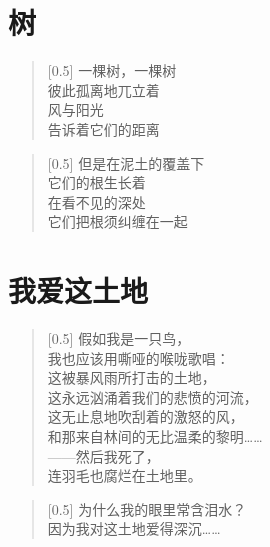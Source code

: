 \documentclass[12pt,UTF-8,openany]{ctexbook}
\begin{document}
\chapter{树}

\begin{normalsize}
    
    \begin{verse}[0.5\linewidth]
        一棵树，一棵树 \\
        彼此孤离地兀立着 \\
        风与阳光 \\
        告诉着它们的距离
    \end{verse}
    
    
    \begin{verse}[0.5\linewidth]
        但是在泥土的覆盖下 \\
        它们的根生长着 \\
        在看不见的深处 \\
        它们把根须纠缠在一起
    \end{verse}
    
\end{normalsize}



\chapter{我爱这土地}

\begin{normalsize}
    
    \begin{verse}[0.5\linewidth]
        假如我是一只鸟， \\
        我也应该用嘶哑的喉咙歌唱： \\
        这被暴风雨所打击的土地， \\
        这永远汹涌着我们的悲愤的河流， \\
        这无止息地吹刮着的激怒的风， \\
        和那来自林间的无比温柔的黎明…… \\
        ——然后我死了， \\
        连羽毛也腐烂在土地里。
    \end{verse}
    
    
    \begin{verse}[0.5\linewidth]
        为什么我的眼里常含泪水？ \\
        因为我对这土地爱得深沉……
    \end{verse}
    
\end{normalsize}
\end{document}
